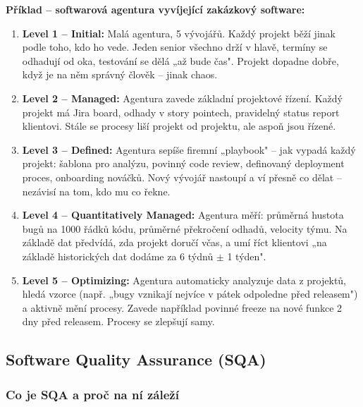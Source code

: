 \textbf{Příklad -- softwarová agentura vyvíjející zakázkový software:}
\begin{enumerate}
  \item \textbf{Level 1 -- Initial:} Malá agentura, 5 vývojářů. Každý projekt běží jinak podle toho,
    kdo ho vede. Jeden senior všechno drží v hlavě, termíny se odhadují od oka, testování se dělá
    „až bude čas". Projekt dopadne dobře, když je na něm správný člověk -- jinak chaos.

  \item \textbf{Level 2 -- Managed:} Agentura zavede základní projektové řízení. Každý projekt má
    Jira board, odhady v story pointech, pravidelný status report klientovi. Stále se procesy liší
    projekt od projektu, ale aspoň jsou řízené.

  \item \textbf{Level 3 -- Defined:} Agentura sepíše firemní „playbook" -- jak vypadá každý projekt:
    šablona pro analýzu, povinný code review, definovaný deployment proces, onboarding nováčků.
    Nový vývojář nastoupí a ví přesně co dělat -- nezávisí na tom, kdo mu co řekne.

  \item \textbf{Level 4 -- Quantitatively Managed:} Agentura měří: průměrná hustota bugů na 1000
    řádků kódu, průměrné překročení odhadů, velocity týmu. Na základě dat předvídá, zda projekt
    doručí včas, a umí říct klientovi „na základě historických dat dodáme za 6 týdnů $\pm$ 1 týden".

  \item \textbf{Level 5 -- Optimizing:} Agentura automaticky analyzuje data z projektů, hledá
    vzorce (např. „bugy vznikají nejvíce v pátek odpoledne před releasem") a aktivně mění procesy.
    Zavede například povinné freeze na nové funkce 2 dny před releasem. Procesy se zlepšují samy.
\end{enumerate}

\subsection{Software Quality Assurance (SQA)}

\subsubsection{Co je SQA a proč na ní záleží}

